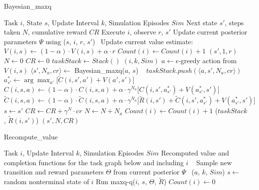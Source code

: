 \begin{algorithm}[t]
\caption{{\sc Bayesian\_maxq}} \label{alg:bmaxq}
\begin{algorithmic}[1]
\REQUIRE Task $i$, State $s$, Update Interval $k$, Simulation Episodes $Sim$
\ENSURE Next state $s'$, steps taken $N$, cumulative reward $CR$
\STATE Execute $i$, observe $r$, $s'$
\STATE Update current posterior parameters $\Psi$ using ($s$, $i$, $r$, $s'$)~\label{line:update}
\STATE Update current value estimate: $V(i,s) \leftarrow (1-\alpha)\cdot V(i,s)+\alpha\cdot r$
\STATE $Count(i) \leftarrow Count(i)+1$
\RETURN $(s', 1, r)$
\ELSE               %
\STATE $N \leftarrow 0$ 
\STATE $CR \leftarrow 0$ 
\STATE $taskStack \leftarrow Stack()$
$(i, k, Sim)$
\STATE $a\leftarrow \epsilon$-greedy action from $V(i, s)$
\STATE $\langle s', N_a, cr\rangle \leftarrow$ {\sc Bayesian\_maxq}($a$, $s$) ~\label{line:recursive}
\STATE $taskStack.push(\langle a, s', N_a, cr \rangle)$    
\STATE $a^*_{s'}\leftarrow \arg\max_{a'}\bigl[\tilde{C}(i,s',a')+V(a',s')\bigr]$ ~\label{line:comp1}
\STATE $C(i,s,a)\leftarrow(1-\alpha)\cdot C(i,s,a) + \alpha\cdot \gamma^{N_a}\bigl[C(i,s',a^*_{s'})+V(a^*_{s'},s') \bigr]$~\label{line:comp2}
\STATE $\tilde{C}(i,s,a)\leftarrow(1-\alpha)\cdot \tilde{C}(i,s,a) + \alpha\cdot \gamma^{N_a}\bigl[\tilde{R}(i, s')+\tilde{C}(i,s',a^*_{s'})+V(a^*_{s'},s') \bigr]$
\STATE $s\leftarrow s'$
\STATE $CR \leftarrow CR+\gamma^N\cdot cr$
\STATE $N\leftarrow N+N_a$
\STATE $Count(i) \leftarrow Count(i)+1$
\ENDWHILE
{}($taskStack$, $\tilde{R}(i, s')$)
\RETURN $(s', N, CR)$
\ENDIF
\end{algorithmic}
\end{algorithm} 


\begin{algorithm}[t]
\caption{{\sc Recompute\_value}} \label{alg:recompvalue}
\begin{algorithmic}[1]
\REQUIRE Task $i$, Update Interval $k$, Simulation Episodes $Sim$
\ENSURE Recomputed value and completion functions for the task graph below and including $i$
\RETURN~\label{line:checkk}
\ENDIF
{}  
\STATE Sample new transition and reward parameters $\Theta$ from
current posterior $\Psi$~\label{line:sample}
\ELSE
{}
($a$, $k$, $Sim$)
\ENDFOR
{}
\STATE $s \leftarrow$ random nonterminal state of $i$
\STATE Run {\sc maxq-q}($i$, $s$, $\Theta$, $\tilde{R}$) %
\ENDFOR
\ENDIF
\STATE $Count(i) \leftarrow 0$
\end{algorithmic}
\end{algorithm} 

